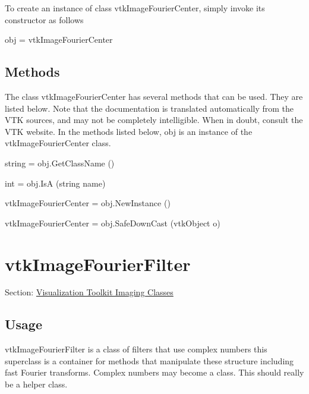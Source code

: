 To create an instance of class vtk\-Image\-Fourier\-Center, simply invoke its constructor as follows \begin{DoxyVerb}  obj = vtkImageFourierCenter
\end{DoxyVerb}
 \hypertarget{vtkwidgets_vtkxyplotwidget_Methods}{}\subsection{Methods}\label{vtkwidgets_vtkxyplotwidget_Methods}
The class vtk\-Image\-Fourier\-Center has several methods that can be used. They are listed below. Note that the documentation is translated automatically from the V\-T\-K sources, and may not be completely intelligible. When in doubt, consult the V\-T\-K website. In the methods listed below, {\ttfamily obj} is an instance of the vtk\-Image\-Fourier\-Center class. 
\begin{DoxyItemize}
\item {\ttfamily string = obj.\-Get\-Class\-Name ()}  
\item {\ttfamily int = obj.\-Is\-A (string name)}  
\item {\ttfamily vtk\-Image\-Fourier\-Center = obj.\-New\-Instance ()}  
\item {\ttfamily vtk\-Image\-Fourier\-Center = obj.\-Safe\-Down\-Cast (vtk\-Object o)}  
\end{DoxyItemize}\hypertarget{vtkimaging_vtkimagefourierfilter}{}\section{vtk\-Image\-Fourier\-Filter}\label{vtkimaging_vtkimagefourierfilter}
Section\-: \hyperlink{sec_vtkimaging}{Visualization Toolkit Imaging Classes} \hypertarget{vtkwidgets_vtkxyplotwidget_Usage}{}\subsection{Usage}\label{vtkwidgets_vtkxyplotwidget_Usage}
vtk\-Image\-Fourier\-Filter is a class of filters that use complex numbers this superclass is a container for methods that manipulate these structure including fast Fourier transforms. Complex numbers may become a class. This should really be a helper class.

